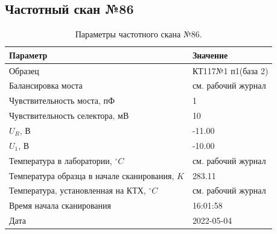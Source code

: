 \subsection{Частотный скан №86}
\begin{table}[!ht]
    \centering
    \caption{Параметры частотного скана №86.}
    \begin{tabular}{|l|l|}
        \hline
        Параметр                                       & Значение                  \\ \hline
        Образец                                        & КТ117№1 п1(база 2)        \\ \hline
        Балансировка моста                             & см. рабочий журнал        \\ \hline
        Чувствительность моста, пФ                     & 1                         \\ \hline
        Чувствительность селектора, мВ                 & 10                        \\ \hline
        $U_R$, В                                       & -11.00                    \\ \hline
        $U_1$, В                                       & -10.00                    \\ \hline
        Температура в лаборатории, $^\circ C$          & см. рабочий журнал        \\ \hline
        Температура образца в начале сканирования, $K$ & 283.11                    \\ \hline
        Температура, установленная на КТХ, $^\circ C$  & см. рабочий журнал        \\ \hline
        Время начала сканирования                      & 16:01:58                  \\ \hline
        Дата                                           & 2022-05-04                \\ \hline
    \end{tabular}
    \label{table:frequency_scan_86}
\end{table}

